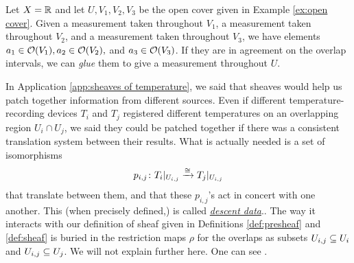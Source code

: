 \documentclass[CT4S-EN-RU]{subfiles}
\begin{document}
\begin{definitionRUS}\label{def:sheaf}
\end{definitionRUS}

\begin{exampleENG}
Let $X=\RR$ and let $U, V_1,V_2,V_3$ be the open cover given in Example \ref{ex:open cover}. Given a measurement taken throughout $V_1$, a measurement taken throughout $V_2$, and a measurement taken throughout $V_3$, we have elements $a_1\in\mcO(V_1), a_2\in\mcO(V_2),$ and $a_3\in\mcO(V_3)$. If they are in agreement on the overlap intervals, we can {\em glue}  them to give a measurement throughout $U$.
\end{exampleENG}

\begin{exampleRUS}
\end{exampleRUS}

\begin{remarkENG}
In Application \ref{app:sheaves of temperature}, we said that sheaves would help us patch together information from different sources. Even if different temperature-recording devices $T_i$ and $T_j$ registered different temperatures on an overlapping region $U_i\cap U_j$, we said they could be patched together if there was a consistent translation system between their results. What is actually needed is a set of isomorphisms 
$$p_{i,j}\taking T_i|_{U_{i,j}}\To{\iso} T_j|_{U_{i,j}}$$ 
that translate between them, and that these $p_{i,j}$'s act in concert with one another. This (when precisely defined,) is called \href{http://en.wikipedia.org/wiki/Descent_theory}{\em descent data}.. The way it interacts with our definition of sheaf given in Definitions \ref{def:presheaf} and \ref{def:sheaf} is buried in the restriction maps $\rho$ for the overlaps as subsets $U_{i,j}\ss U_i$ and $U_{i,j}\ss U_j$. We will not explain further here. One can see \cite{Gro}.
\end{remarkENG}

\begin{remarkRUS}
\end{remarkRUS}
\end{document}
